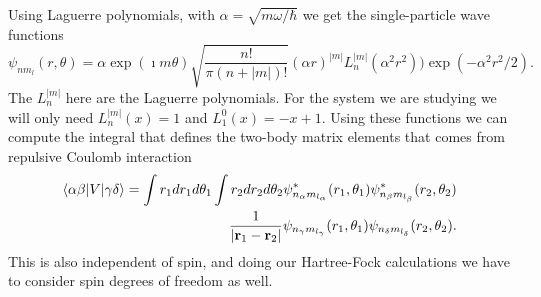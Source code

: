 	Using Laguerre polynomials, with $\alpha = \sqrt{m\omega / \hbar}$ we get the single-particle wave functions 
	\[
	\psi_{nm_{l}}(r,\theta)=\alpha\exp(\imath m\theta)\sqrt{\frac{n!}{\pi(n+|m|)!}}(\alpha r)^{|m|}L_{n}^{|m|}(\alpha^{2}r^{2}))\exp(-\alpha^{2}r^{2}/2).
	\]
	The $L_{n}^{|m|}$ here are the Laguerre polynomials. For the system we are studying we will only need $L_{n}^{|m|} (x) = 1$ and $L_{1}^{0}(x)=-x+1$. Using these functions we can compute the integral that defines the two-body matrix elements that comes from repulsive Coulomb interaction
	\begin{eqnarray*}
	\langle\alpha\beta|V|\gamma\delta\rangle=\int r_{1}dr_{1}d\theta_{1}\int r_{2}dr_{2}d\theta_{2}\psi_{n_{\alpha}m_{l_{\alpha}}}^{*}(r_{1},\theta_{1})\psi_{n_{\beta}m_{l_{\beta}}}^{*}(r_{2},\theta_{2})\\
	\frac{1}{|{\bf r}_{1}-{\bf r}_{2}|}\psi_{n_{\gamma}m_{l_{\gamma}}}(r_{1},\theta_{1})\psi_{n_{\delta}m_{l_{\delta}}}(r_{2},\theta_{2}).
	\end{eqnarray*}
	This is also independent of spin, and doing our Hartree-Fock calculations we have to consider spin degrees of freedom as well. 

